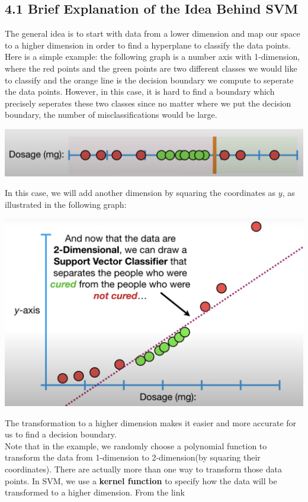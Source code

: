 \documentclass[12pt]{article}
\begin{document}
\subsection*{4.1 Brief Explanation of the Idea Behind SVM}
The general idea is to start with data from a lower dimension and map our space to a higher dimension in order to find a hyperplane to classify the data points. Here is a simple example: the following graph is a number axis with 1-dimension, where the red points and the green points are two different classes we would like to classify and 
the orange line is the decision boundary we compute to seperate the data points. However, in this case, it is hard to find a boundary which precisely seperates these two classes since no matter where we put the decision boundary, the number of misclassifications would be large. 
\begin{center}
    \includegraphics[scale=0.3]{fig/ec_num_axis.png}
\end{center}
In this case, we will add another dimension by squaring the coordinates as $y$, as illustrated in the following graph: 
\begin{center}
    \includegraphics[scale=0.25]{fig/ec_2d.png} \\
\end{center}
The transformation to a higher dimension makes it easier and more accurate for us to find a decision boundary. \\
Note that in the example, we randomly choose a polynomial function to transform the data from 1-dimension to 2-dimension(by squaring their coordinates). There are actually more than one way to transform those data points. In SVM, we use a \textbf{kernel function} to specify how the data will be transformed to a higher dimension. From the link 
\end{document}
